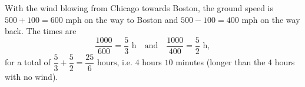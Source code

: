 With the wind blowing from Chicago towards Boston, the ground speed is $500+100=600$ mph on the way to Boston and $500-100=400$ mph on the way back. The times are
\[
\dfrac{1000}{600}=\dfrac{5}{3}\text{ h}\quad\text{and}\quad\dfrac{1000}{400}=\dfrac{5}{2}\text{ h},
\]
for a total of $\dfrac{5}{3}+\dfrac{5}{2}=\boxed{\dfrac{25}{6}\text{ hours}}$, i.e. $4$ hours $10$ minutes (longer than the $4$ hours with no wind).
